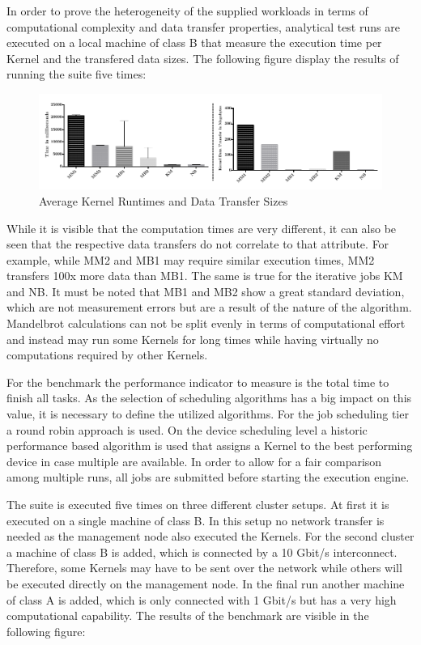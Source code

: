 In order to prove the heterogeneity of the supplied workloads in terms of computational complexity and data transfer properties, analytical test runs are executed on a local machine of class B that measure the execution time per Kernel and the transfered data sizes. The following figure display the results of running the suite five times:

\begin{figure}[H]
	
	\includegraphics[width=1.0\textwidth]{images/benchmark_kernel_data_transfers.pdf}
	\centering
	\caption{Average Kernel Runtimes and Data Transfer Sizes}
	\label{img:benchmark_kernel_attributes}
\end{figure}

While it is visible that the computation times are very different, it can also be seen that the respective data transfers do not correlate to that attribute. For example, while MM2 and MB1 may require similar execution times, MM2 transfers 100x more data than MB1. The same is true for the iterative jobs KM and NB. It must be noted that MB1 and MB2 show a great standard deviation, which are not measurement errors but are a result of the nature of the algorithm. Mandelbrot calculations can not be split evenly in terms of computational effort and instead may run some Kernels for long times while having virtually no computations required by other Kernels.

For the benchmark the performance indicator to measure is the total time to finish all tasks. As the selection of scheduling algorithms has a big impact on this value, it is necessary to define the utilized algorithms. For the job scheduling tier a round robin approach is used. On the device scheduling level a historic performance based algorithm is used that assigns a Kernel to the best performing device in case multiple are available. In order to allow for a fair comparison among multiple runs, all jobs are submitted before starting the execution engine.

The suite is executed five times on three different cluster setups. At first it is executed on a single machine of class B. In this setup no network transfer is needed as the management node also executed the Kernels. For the second cluster a machine of class B is added, which is connected by a 10 Gbit/s interconnect. Therefore, some Kernels may have to be sent over the network while others will be executed directly on the management node. In the final run another machine of class A is added, which is only connected with 1 Gbit/s but has a very high computational capability. The results of the benchmark are visible in the following figure:

